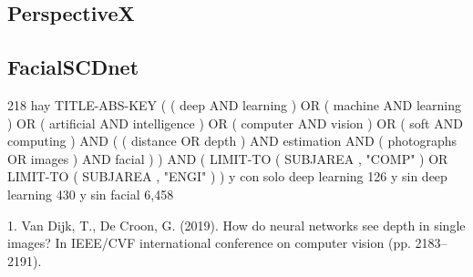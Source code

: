 \subsection{PerspectiveX}

\subsection{FacialSCDnet}
































218 hay TITLE-ABS-KEY ( ( deep AND learning ) OR ( machine AND learning ) OR ( artificial AND intelligence ) OR ( computer AND vision ) OR ( soft AND computing ) AND ( ( distance OR depth ) AND estimation AND ( photographs OR images ) AND facial ) ) AND ( LIMIT-TO ( SUBJAREA , "COMP" ) OR LIMIT-TO ( SUBJAREA , "ENGI" ) )
y con solo deep learning 126
y sin deep learning 430
y sin facial 6,458 

1. Van Dijk, T.,  De Croon, G. (2019). How do neural networks see depth in single images? In IEEE/CVF international conference on computer vision (pp. 2183–2191).
